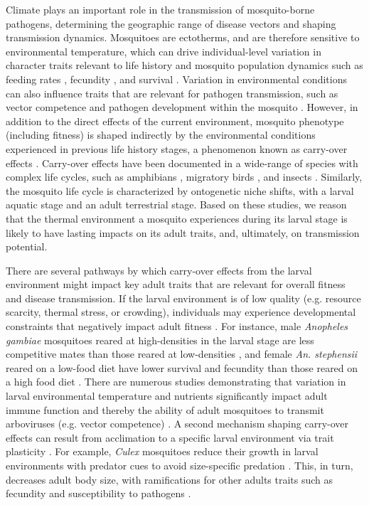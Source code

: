 \documentclass[12pt]{article}
\begin{document}
Climate plays an important role in the transmission of mosquito-borne pathogens, determining the geographic range of disease vectors and shaping transmission dynamics. Mosquitoes are ectotherms, and are therefore sensitive to environmental temperature, which can drive individual-level variation in character traits relevant to life history and mosquito population dynamics such as feeding rates \citep{delatte2009}, fecundity \citep{yang2009}, and survival \citep{alto2001}. Variation in environmental conditions can also influence traits that are relevant for pathogen transmission, such as vector competence and pathogen development within the mosquito \citep{lambrechts2011}. However, in addition to the direct effects of the current environment, mosquito phenotype (including fitness) is shaped indirectly by the environmental conditions experienced in previous life history stages, a phenomenon known as carry-over effects \citep{harrison2011}. Carry-over effects have been documented in a wide-range of species with complex life cycles, such as amphibians \citep{vonesh2005}, migratory birds \citep{norris2006}, and insects \citep{deblock2005a, roux2015a}. Similarly, the mosquito life cycle is characterized by ontogenetic niche shifts, with a larval aquatic stage and an adult terrestrial stage. Based on these studies, we reason that the thermal environment a mosquito experiences during its larval stage is likely to have lasting impacts on its adult traits, and, ultimately, on transmission potential.


There are several pathways by which carry-over effects from the larval environment might impact key adult traits that are relevant for overall fitness and disease transmission. If the larval environment is of low quality (e.g. resource scarcity, thermal stress, or crowding), individuals may experience developmental constraints that negatively impact adult fitness \citep{inger2010}. For instance, male \textit{Anopheles gambiae} mosquitoes reared at high-densities in the larval stage are less competitive mates than those reared at low-densities \citep{nghabi2005}, and female \textit{An. stephensii} reared on a low-food diet have lower survival and fecundity than those reared on a high food diet \citep{moller-jacobs2014, shapiro2016}. There are numerous studies demonstrating that variation in larval environmental temperature and nutrients significantly impact adult immune function \citep{muturi2012, price2015} and thereby the ability of adult mosquitoes to transmit arboviruses (e.g. vector competence) \citep{grimstad1991, muturi2012a, muturi2011d, alto2013, vantaux2016, buckner2016}. A second mechanism shaping carry-over effects can result from acclimation to a specific larval environment via trait plasticity \citep{monaghan2008}. For example, \textit{Culex} mosquitoes reduce their growth in larval environments with predator cues to avoid size-specific predation \citep{jourdan2016}. This, in turn, decreases adult body size, with ramifications for other adults traits such as fecundity \citep{lounibos2002} and susceptibility to pathogens \citep{paulson1991}.
\end{document}
